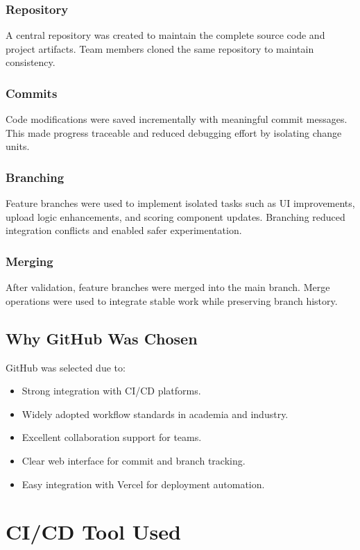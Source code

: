 \documentclass[12pt,a4paper]{report}
\begin{document}
\subsection{Repository}
A central repository was created to maintain the complete source code and project artifacts. Team members cloned the same repository to maintain consistency.

\subsection{Commits}
Code modifications were saved incrementally with meaningful commit messages. This made progress traceable and reduced debugging effort by isolating change units.

\subsection{Branching}
Feature branches were used to implement isolated tasks such as UI improvements, upload logic enhancements, and scoring component updates. Branching reduced integration conflicts and enabled safer experimentation.

\subsection{Merging}
After validation, feature branches were merged into the main branch. Merge operations were used to integrate stable work while preserving branch history.

\section{Why GitHub Was Chosen}
GitHub was selected due to:
\begin{itemize}[leftmargin=1.2cm]
    \item Strong integration with CI/CD platforms.
    \item Widely adopted workflow standards in academia and industry.
    \item Excellent collaboration support for teams.
    \item Clear web interface for commit and branch tracking.
    \item Easy integration with Vercel for deployment automation.
\end{itemize}

\chapter{CI/CD Tool Used}
\end{document}
